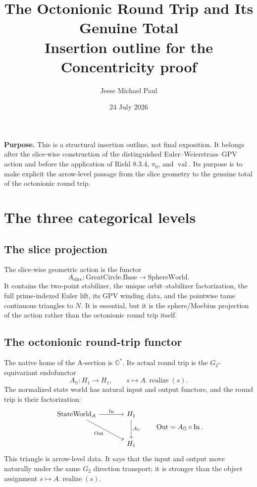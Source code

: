 \documentclass[11pt]{article}
\title{\textbf{The Octonionic Round Trip and Its Genuine Total}\\
\large Insertion outline for the Concentricity proof}
\author{Jesse Michael Paul}
\date{24 July 2026}
\newcommand{\OO}{\mathbb O}
\newcommand{\Ostar}{\OO^{*}}
\newcommand{\In}{\operatorname{In}}
\newcommand{\Out}{\operatorname{Out}}
\begin{document}
\maketitle

\noindent\textcolor{warmgray}{\textbf{Purpose.}}
This is a structural insertion outline, not final exposition.  It belongs
after the slice-wise construction of the distinguished
Euler--Weierstrass--GPV action and before the application of Riehl 8.3.4,
$\pi_0$, and $\operatorname{val}$.  Its purpose is to make explicit the
arrow-level passage from the slice geometry to the genuine total of the
octonionic round trip.

\section{The three categorical levels}

\subsection{The slice projection}

The slice-wise geometric action is the functor
\[
  A_{\mathrm{slice}}\colon
  \mathrm{GreatCircle.Base}\longrightarrow\mathrm{SphereWorld}.
\]
It contains the two-point stabilizer, the unique orbit--stabilizer
factorization, the full prime-indexed Euler lift, its GPV winding data, and
the pointwise tame continuous triangles to $N$.  It is essential, but it is
the sphere/Moebius projection of the action rather than the octonionic
round trip itself.

\subsection{The octonionic round-trip functor}

The native home of the A-section is $\Ostar$.  Its actual round trip is the
$G_2$-equivariant endofunctor
\[
  A_{\OO}\colon H_1\longrightarrow H_1,
  \qquad s\longmapsto A.\operatorname{realize}(s).
\]
The normalized state world has natural input and output functors, and the
round trip is their factorization:
\[
\begin{tikzcd}[column sep=large,row sep=large]
  \mathrm{StateWorld}_A
    \arrow[r,"\In"]
    \arrow[dr,"\Out"']
  & H_1 \arrow[d,"A_{\OO}"] \\
  & H_1
\end{tikzcd}
\qquad
\Out=A_{\OO}\circ\In.
\]
This triangle is arrow-level data.  It says that the input and output move
naturally under the same $G_2$ direction transport; it is stronger than the
object assignment $s\mapsto A.\operatorname{realize}(s)$.
\end{document}
